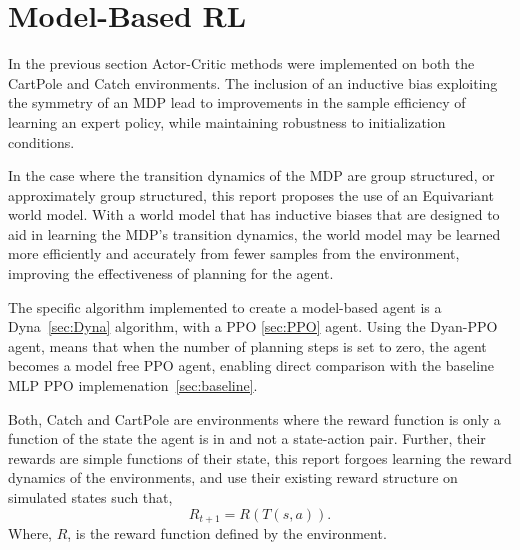 \section{Model-Based RL}\label{sec:model-based}
In the previous section Actor-Critic methods were implemented on both the CartPole and Catch environments. The inclusion of an inductive bias exploiting the symmetry of an MDP lead to improvements in the sample efficiency of learning an expert policy, while maintaining robustness to initialization conditions.

In the case where the transition dynamics of the MDP are group structured, or approximately group structured, this report proposes the use of an Equivariant world model. With a world model that has inductive biases that are designed to aid in learning the MDP's transition dynamics, the world model may be learned more efficiently and accurately from fewer samples from the environment, improving the effectiveness of planning for the agent.

The specific algorithm implemented to create a model-based agent is a Dyna~\ref{sec:Dyna} algorithm, with a PPO \ref{sec:PPO} agent. Using the Dyan-PPO agent, means that when the number of planning steps is set to zero, the agent becomes a model free PPO agent, enabling direct comparison with the baseline MLP PPO implemenation~\ref{sec:baseline}.

Both, Catch and CartPole are environments where the reward function is only a function of the state the agent is in and not a state-action pair. Further, their rewards are simple functions of their state, this report forgoes learning the reward dynamics of the environments, and use their existing reward structure on simulated states such that,
\begin{equation}
	R_{t+1} = R(T(s, a)).
\end{equation}
Where, $R$, is the reward function defined by the environment.

